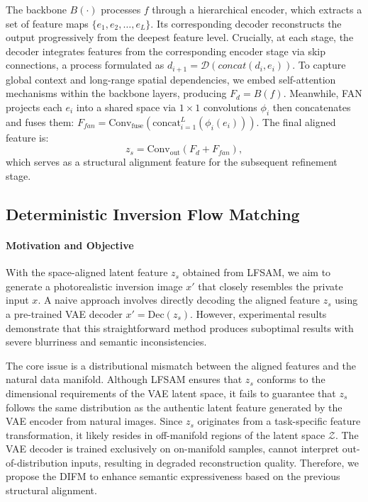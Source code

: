 The backbone $B(\cdot)$ processes $f$ through a hierarchical encoder, which extracts a set of feature maps $\{e_1,e_2, \ldots, e_L\}$. 
Its corresponding decoder reconstructs the output progressively from the deepest feature level. 
Crucially, at each stage, the decoder integrates features from the corresponding encoder stage via skip connections, a process formulated as $d_{i+1}=\mathcal{D}(concat(d_i,e_{i}))$. 
To capture global context and long-range spatial dependencies, we embed self-attention mechanisms within the backbone layers, producing $F_{d}=B(f)$. 
Meanwhile, FAN projects each $e_i$ into a shared space via $1\times 1$ convolutions $\phi_i$ then concatenates and fuses them: $F_{fan}=\text{Conv}_{\text{fuse}}(\text{concat}_{i=1}^L(\phi_i(e_i)))$.
The final aligned feature is:
\begin{equation}
z_s = \text{Conv}_{\text{out}}(F_{d} + F_{fan}),
\end{equation}
which serves as a structural alignment feature for the subsequent refinement stage.

\subsection{Deterministic Inversion Flow Matching}
\label{sec:fm} 
\paragraph{Motivation and Objective}
With the space-aligned latent feature $z_s$ obtained from LFSAM, we aim to generate a photorealistic inversion image $x'$ that closely resembles the private input $x$. 
A naive approach involves directly decoding the aligned feature $z_s$ using a pre-trained VAE decoder $x' = \text{Dec}(z_s)$. 
However, experimental results demonstrate that this straightforward method produces suboptimal results with severe blurriness and semantic inconsistencies. 


The core issue is a distributional mismatch between the aligned features and the natural data manifold. 
Although LFSAM ensures that $z_s$ conforms to the dimensional requirements of the VAE latent space, it fails to guarantee that $z_s$ follows the same distribution as the authentic latent feature generated by the VAE encoder from natural images.
Since $z_s$ originates from a task-specific feature transformation, it likely resides in off-manifold regions of the latent space $\mathcal{Z}$. 
The VAE decoder is trained exclusively on on-manifold samples, cannot interpret out-of-distribution inputs, resulting in degraded reconstruction quality.
Therefore, we propose the DIFM to enhance semantic expressiveness based on the previous structural alignment.
